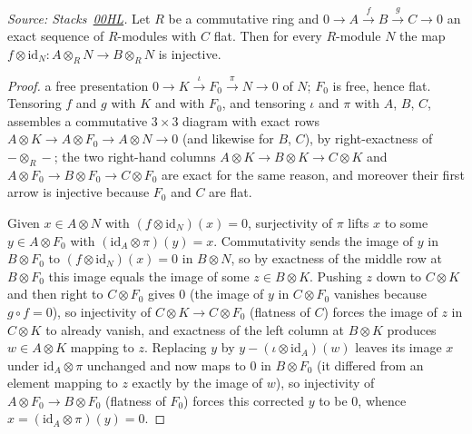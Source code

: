\begin{lemma}\label{mk-lem:flat_cokernel_rTensor_injective}
  \leanok

  \textit{Source: Stacks~\href{https://stacks.math.columbia.edu/tag/00HL}{00HL}.}
  Let \(R\) be a commutative ring and \(0 \to A \xrightarrow{f} B
  \xrightarrow{g} C \to 0\) an exact sequence of \(R\)-modules with \(C\)
  flat. Then for every \(R\)-module \(N\) the map
  \(f \otimes \mathrm{id}_N : A \otimes_R N \to B \otimes_R N\) is injective.
\end{lemma}
\begin{proof}
  \leanokChoose a free presentation \(0 \to K \xrightarrow{\iota} F_0
  \xrightarrow{\pi} N \to 0\) of \(N\); \(F_0\) is free, hence flat.
  Tensoring \(f\) and \(g\) with \(K\) and with \(F_0\), and tensoring
  \(\iota\) and \(\pi\) with \(A\), \(B\), \(C\), assembles a commutative
  \(3 \times 3\) diagram with exact rows
  \(A \otimes K \to A \otimes F_0 \to A \otimes N \to 0\) (and likewise for
  \(B\), \(C\)), by right-exactness of \(- \otimes_R -\); the two right-hand
  columns \(A \otimes K \to B \otimes K \to C \otimes K\) and
  \(A \otimes F_0 \to B \otimes F_0 \to C \otimes F_0\) are exact for the
  same reason, and moreover their first arrow is injective because \(F_0\)
  and \(C\) are flat.

  Given \(x \in A \otimes N\) with \((f \otimes \mathrm{id}_N)(x) = 0\),
  surjectivity of \(\pi\) lifts \(x\) to some \(y \in A \otimes F_0\) with
  \((\mathrm{id}_A \otimes \pi)(y) = x\). Commutativity sends the image of
  \(y\) in \(B \otimes F_0\) to \((f \otimes \mathrm{id}_N)(x) = 0\) in
  \(B \otimes N\), so by exactness of the middle row at \(B \otimes F_0\)
  this image equals the image of some \(z \in B \otimes K\). Pushing \(z\)
  down to \(C \otimes K\) and then right to \(C \otimes F_0\) gives \(0\)
  (the image of \(y\) in \(C \otimes F_0\) vanishes because
  \(g \circ f = 0\)), so injectivity of \(C \otimes K \to C \otimes F_0\)
  (flatness of \(C\)) forces the image of \(z\) in \(C \otimes K\) to
  already vanish, and exactness of the left column at \(B \otimes K\)
  produces \(w \in A \otimes K\) mapping to \(z\). Replacing \(y\) by
  \(y - (\iota \otimes \mathrm{id}_A)(w)\) leaves its image \(x\) under
  \(\mathrm{id}_A \otimes \pi\) unchanged and now maps to \(0\) in
  \(B \otimes F_0\) (it differed from an element mapping to \(z\) exactly by
  the image of \(w\)), so injectivity of \(A \otimes F_0 \to B \otimes F_0\)
  (flatness of \(F_0\)) forces this corrected \(y\) to be \(0\), whence
  \(x = (\mathrm{id}_A \otimes \pi)(y) = 0\).
\end{proof}

